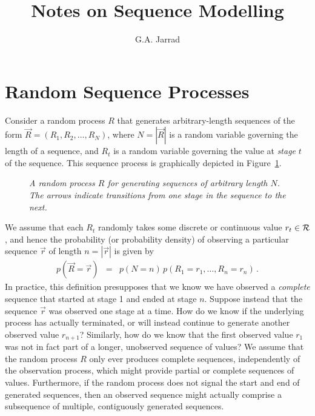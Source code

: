 \documentclass[a4paper]{article}
\title{Notes on Sequence Modelling}
\author{G.A. Jarrad}
\begin{document}
\maketitle
{}
\section{Random Sequence Processes}
\label{sec:random-processes}
Consider a random process $R$ that generates arbitrary-length sequences
of the form $\vec{R}=(R_1,R_2,\ldots,R_N)$, where $N=|\vec{R}|$ is a random variable governing
the length of a sequence, and $R_t$ is a random variable governing the value at {\em stage} $t$
of the sequence. This sequence process is graphically depicted in Figure~\ref{fig:R-process}.
\begin{figure}[hbt]
\centering
{}
\caption{\em A random process $R$ for generating sequences of arbitrary length $N$. The arrows indicate transitions from one stage in the sequence to the next.}
\label{fig:R-process}
\end{figure}

We assume that each $R_t$ randomly takes some discrete or continuous value $r_t\in{\cal R}$,
and hence the probability (or probability density) of observing a particular
sequence $\vec{r}$ of length $n=|\vec{r}|$ is given by
\begin{eqnarray}
   p(\vec{R}\!=\!\vec{r}) & = & p(N=n)\,p(R_1\!=\!r_1,\ldots,R_n\!=\!r_n)\,.
\end{eqnarray}
In practice, this definition presupposes that we know we have observed a {\em complete} sequence that started
at stage 1 and ended at stage $n$.
Suppose instead that the sequence $\vec{r}$ was observed one stage at a time. How do we know if the
underlying process has actually terminated, or will instead
continue to generate another observed value $r_{n+1}$? 
Similarly, how do we know that the first observed value $r_1$ was not in fact
part of a longer, unobserved sequence of values?
We assume that the random process $R$ only ever produces complete sequences,
independently of the observation process, which might provide partial or complete sequences of values.
Furthermore, if the random process does not signal the start and end of generated sequences,
then an observed sequence might actually comprise a subsequence of multiple, contiguously generated sequences.
\end{document}

